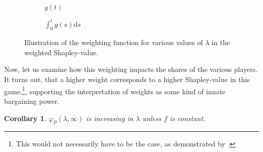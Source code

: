 \documentclass[a4paper]{article}
\newtheorem{corollary}{Corollary}
\newcommand{\ds}{\mathrm{d}s}
\begin{document}
\begin{figure}[ht]
    \centering
    \begin{subfigure}[b]{0.45\textwidth}
        \centering
        \caption{$g(t)$}
    \end{subfigure}
    \begin{subfigure}[b]{0.45\textwidth}
        \centering
        \caption{$\int_0^t g(s) \ds$}
    \end{subfigure}
    \caption{Illustration of the weighting function for various values of $\lambda$ in the weighted Shapley-value.}
    \label{fig:weigh_function}
\end{figure}

Now, let us examine how this weighting impacts the shares of the various players.
It turns out, that a higher weight corresponds to a higher Shapley-value in this game.\footnote{
    This would not necessarily have to be the case, as demonstrated by \textcite{owen1968communications}.
},
supporting the interpretation of weights as some kind of innate bargaining power.
\begin{corollary}
    \label{cor:platform_value_weighted}
    $\varphi_P(\lambda, \infty)$ is increasing in $\lambda$ unless $f$ is constant.
\end{corollary}
\end{document}
